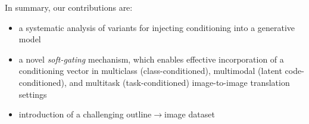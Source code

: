In summary, our contributions are:
\vspace{-2mm}
\begin{itemize}[noitemsep]
\item a systematic analysis of variants for injecting conditioning into a generative model
\item a novel \textit{soft-gating} mechanism, which enables effective incorporation of a conditioning vector in multiclass (class-conditioned), multimodal (latent code-conditioned), and multitask (task-conditioned) image-to-image translation settings
\item introduction of a challenging outline$\rightarrow$image dataset
\end{itemize}

\vspace{-1mm}